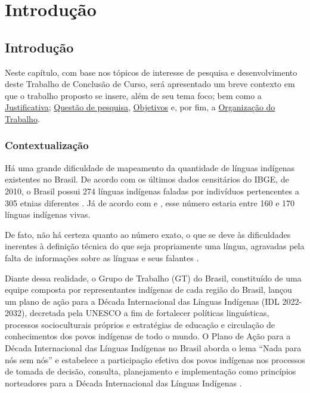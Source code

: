 \setcounter{chapter}{1}
\chapter*[Introdução]{Introdução}
\section{Introdução}

Neste capítulo, com base nos tópicos de interesse de pesquisa e desenvolvimento deste Trabalho de Conclusão de Curso, será apresentado um breve contexto em que o trabalho
proposto se insere, além de seu tema foco; bem como a \hyperref[sec:Justificativa]{Justificativa}; \hyperref[sec:QuestaodePesquisa]{Questão de pesquisa},
\hyperref[sec:Objetivos]{Objetivos} e, por fim, a \hyperref[sec:OrganizacaodoTrabalho]{Organização do Trabalho}.

\subsection{Contextualização}
\label{sec:Contextualização}

Há uma grande dificuldade de mapeamento da quantidade de línguas indígenas existentes no Brasil. De acordo com os últimos dados censitários do IBGE, de 2010, o Brasil
possui 274 línguas indígenas faladas por indivíduos pertencentes a 305 etnias diferentes \cite{ibge}. Já de acordo com \cite{galucioetal2018} e \cite{dangelis2014}, esse
número estaria entre 160 e 170 línguas indígenas vivas.

De fato, não há certeza quanto ao número exato, o que se deve às dificuldades inerentes à definição técnica do que seja propriamente uma língua, agravadas pela falta de
informações sobre as línguas e seus falantes \cite{seki2000}.

Diante dessa realidade, o Grupo de Trabalho (GT) do Brasil, constituído de uma equipe composta por representantes indígenas de cada região do Brasil, lançou um plano de
ação para a Década Internacional das Línguas Indígenas (IDL 2022-2032), decretada pela UNESCO a fim de fortalecer políticas linguísticas, processos socioculturais
próprios e estratégias de educação e circulação de conhecimentos dos povos indígenas de todo o mundo. O Plano de Ação para a Década Internacional das Línguas Indígenas no
Brasil aborda o lema “Nada para nós sem nós” e estabelece a participação efetiva dos povos indígenas nos processos de tomada de decisão, consulta, planejamento e
implementação como princípios norteadores para a Década Internacional das Línguas Indígenas \cite{gtbrasil2021}.

